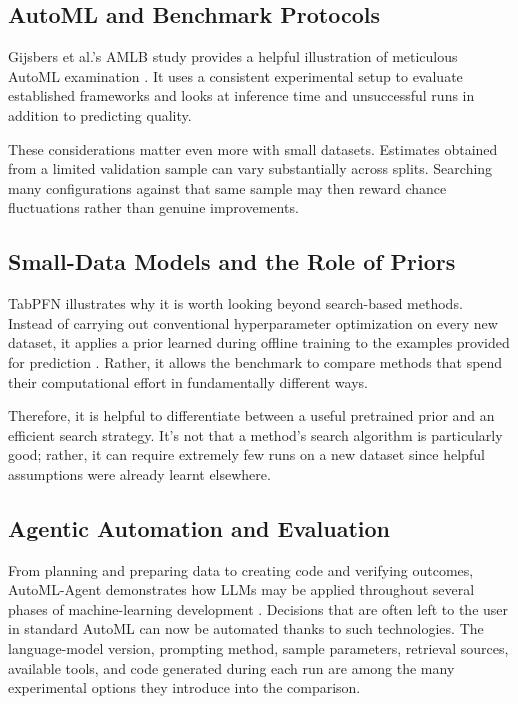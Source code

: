\documentclass[acmsmall,screen]{acmart}
\begin{document}
\subsection{AutoML and Benchmark Protocols}

Gijsbers et al.'s AMLB study provides a helpful illustration of meticulous AutoML examination \cite{gijsbers2024}. It uses a consistent experimental setup to evaluate established frameworks and looks at inference time and unsuccessful runs in addition to predicting quality.

These considerations matter even more with small datasets. Estimates obtained from a limited validation sample can vary substantially across splits. Searching many configurations against that same sample may then reward chance fluctuations rather than genuine improvements.

\subsection{Small-Data Models and the Role of Priors}

TabPFN illustrates why it is worth looking beyond search-based methods. Instead of carrying out conventional hyperparameter optimization on every new dataset, it applies a prior learned during offline training to the examples provided for prediction \cite{hollmann2023}. Rather, it allows the benchmark to compare methods that spend their computational effort in fundamentally different ways.

Therefore, it is helpful to differentiate between a useful pretrained prior and an efficient search strategy. It's not that a method's search algorithm is particularly good; rather, it can require extremely few runs on a new dataset since helpful assumptions were already learnt elsewhere.

\subsection{Agentic Automation and Evaluation}

From planning and preparing data to creating code and verifying outcomes, AutoML-Agent demonstrates how LLMs may be applied throughout several phases of machine-learning development \cite{trirat2025}. Decisions that are often left to the user in standard AutoML can now be automated thanks to such technologies. The language-model version, prompting method, sample parameters, retrieval sources, available tools, and code generated during each run are among the many experimental options they introduce into the comparison.
\end{document}
